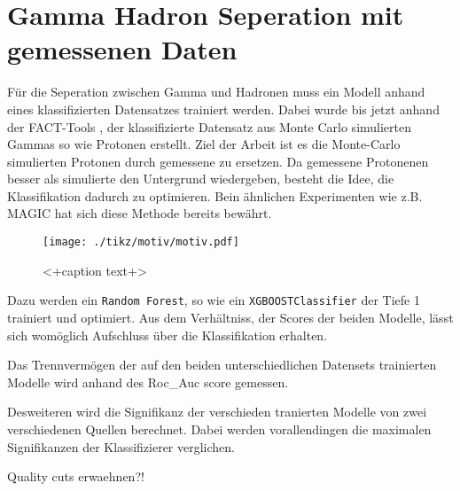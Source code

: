\chapter{Gamma Hadron Seperation mit gemessenen Daten}
Für die Seperation zwischen Gamma und Hadronen muss ein Modell anhand eines klassifizierten Datensatzes trainiert werden.
Dabei wurde bis jetzt anhand der FACT-Tools \cite{FACT-Tools}, der klassifizierte Datensatz aus Monte Carlo simulierten Gammas so wie Protonen erstellt. 
Ziel der Arbeit ist es die Monte-Carlo simulierten Protonen durch gemessene zu ersetzen.
Da gemessene Protonenen besser als simulierte den Untergrund wiedergeben, besteht die Idee, die Klassifikation dadurch zu optimieren.
Bein ähnlichen Experimenten wie z.B. MAGIC hat sich diese Methode bereits bewährt. 
\begin{figure}[H]
  \centering
  \texttt{[image: ./tikz/motiv/motiv.pdf]}
  \caption{<+caption text+>}
  \label{fig:<+label+>}
\end{figure}
Dazu werden ein \texttt{Random Forest}, so wie ein \texttt{XGBOOSTClassifier} der Tiefe 1 trainiert und optimiert.
Aus dem Verhältniss, der Scores der beiden Modelle, lässt sich womöglich Aufschluss über die Klassifikation erhalten.

Das Trennvermögen der auf den beiden unterschiedlichen Datensets trainierten Modelle wird anhand des Roc\_Auc score gemessen.

Desweiteren wird die Signifikanz der verschieden tranierten Modelle von zwei verschiedenen Quellen berechnet. 
Dabei werden vorallendingen die maximalen Signifikanzen der Klassifizierer verglichen.


Quality cuts erwaehnen?!

